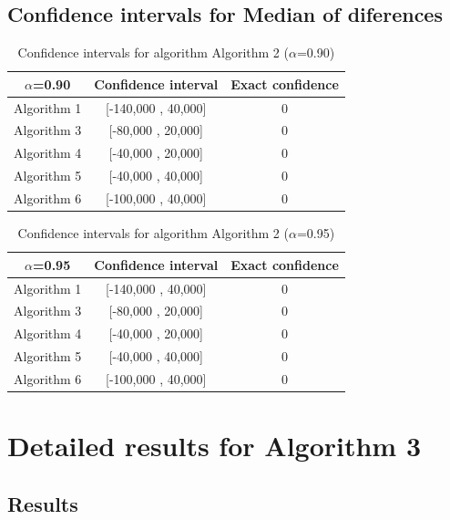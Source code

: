 \documentclass[a4paper,10pt]{article}
\begin{document}
\subsection{Confidence intervals for Median of diferences}

\begin{table}[!htp]
\centering\small
\begin{tabular}{
|c|c|c|}
\hline
 $\alpha$=0.90 & Confidence interval & Exact confidence \\ \hline 
Algorithm 1 & [-140,000 , 40,000] & 0\\ \hline 
Algorithm 3 & [-80,000 , 20,000] & 0\\ \hline 
Algorithm 4 & [-40,000 , 20,000] & 0\\ \hline 
Algorithm 5 & [-40,000 , 40,000] & 0\\ \hline 
Algorithm 6 & [-100,000 , 40,000] & 0\\ \hline 

\end{tabular}
\caption{Confidence intervals for algorithm Algorithm 2 ($\alpha$=0.90)}
\end{table}
\begin{table}[!htp]
\centering\small
\begin{tabular}{
|c|c|c|}
\hline
 $\alpha$=0.95 & Confidence interval & Exact confidence \\ \hline 
Algorithm 1 & [-140,000 , 40,000] & 0\\ \hline 
Algorithm 3 & [-80,000 , 20,000] & 0\\ \hline 
Algorithm 4 & [-40,000 , 20,000] & 0\\ \hline 
Algorithm 5 & [-40,000 , 40,000] & 0\\ \hline 
Algorithm 6 & [-100,000 , 40,000] & 0\\ \hline 

\end{tabular}
\caption{Confidence intervals for algorithm Algorithm 2 ($\alpha$=0.95)}
\end{table}

 \clearpage 


\section{Detailed results for Algorithm 3}


\subsection{Results}
\end{document}
